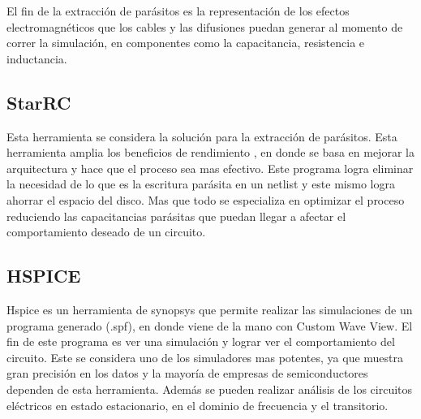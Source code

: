 El fin de la extracción de parásitos es la representación  de los efectos electromagnéticos que los cables y las difusiones puedan generar al momento de correr la simulación, en componentes como la capacitancia, resistencia e inductancia.
 \cite{charls} 

  \subsection{StarRC}

Esta herramienta se considera la solución para la extracción de parásitos. Esta herramienta amplia los beneficios de rendimiento , en donde se basa en mejorar la arquitectura y hace que el proceso sea mas efectivo. Este programa logra eliminar la necesidad de lo que es la escritura parásita en un netlist y este mismo logra ahorrar el espacio del disco. Mas que todo se especializa en optimizar el proceso reduciendo las capacitancias parásitas que puedan llegar a afectar el comportamiento deseado de un circuito.

 \cite{StarRc} 


\subsection{HSPICE}

Hspice es un herramienta de synopsys que permite realizar las simulaciones de un programa generado (.spf), en donde viene de la mano con Custom Wave View. El fin de este programa es ver una simulación y lograr ver el comportamiento del circuito. 
Este se considera uno de los simuladores mas potentes, ya que muestra gran precisión en los datos y la mayoría de empresas de semiconductores dependen de esta herramienta.
Además se pueden realizar análisis de los circuitos eléctricos en estado estacionario, en el dominio de frecuencia y el transitorio.


 \cite{charls} 


